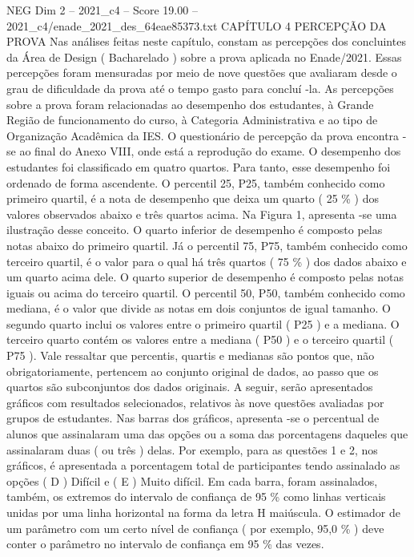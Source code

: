 \begin{textsample}{NEG Dim 2 – 2021\_c4 – Score 19.00 – 2021\_c4/enade\_2021\_des\_64eae85373.txt}  \label{ex:f2_neg_404}
CAPÍTULO 4 PERCEPÇÃO DA PROVA Nas análises feitas neste capítulo, constam as percepções dos concluintes da Área de Design ( Bacharelado ) sobre a prova aplicada no Enade/2021.
Essas percepções foram mensuradas por meio de nove questões que avaliaram desde o grau de dificuldade da prova até o tempo gasto para concluí -la.
As percepções sobre a prova foram relacionadas ao desempenho dos estudantes, à Grande Região de funcionamento do curso, à Categoria Administrativa e ao tipo de Organização Acadêmica da IES.
O questionário de percepção da prova encontra -se ao final do Anexo VIII, onde está a reprodução do exame.
O desempenho dos estudantes foi classificado em quatro quartos.
Para tanto, esse desempenho foi ordenado de forma ascendente.
O percentil 25, P25, também conhecido como primeiro quartil, é a nota de desempenho que deixa um quarto ( 25 \% ) dos valores observados abaixo e três quartos acima.
Na Figura 1, apresenta -se uma ilustração desse conceito.
O quarto inferior de desempenho é composto pelas notas abaixo do primeiro quartil.
Já o percentil 75, P75, também conhecido como terceiro quartil, é o valor para o qual há três quartos ( 75 \% ) dos dados abaixo e um quarto acima dele.
O quarto superior de desempenho é composto pelas notas iguais ou acima do terceiro quartil.
O percentil 50, P50, também conhecido como mediana, é o valor que divide as notas em dois conjuntos de igual tamanho.
O segundo quarto inclui os valores entre o primeiro quartil ( P25 ) e a mediana.
O terceiro quarto contém os valores entre a mediana ( P50 ) e o terceiro quartil ( P75 ).
Vale ressaltar que percentis, quartis e medianas são pontos que, não obrigatoriamente, pertencem ao conjunto original de dados, ao passo que os quartos são subconjuntos dos dados originais.
A seguir, serão apresentados gráficos com resultados selecionados, relativos às nove questões avaliadas por grupos de estudantes.
Nas barras dos gráficos, apresenta -se o percentual de alunos que assinalaram uma das opções ou a soma das porcentagens daqueles que assinalaram duas ( ou três ) delas.
Por exemplo, para as questões 1 e 2, nos gráficos, é apresentada a porcentagem total de participantes tendo assinalado as opções ( D ) Difícil e ( E ) Muito difícil.
Em cada barra, foram assinalados, também, os extremos do intervalo de confiança de 95 \% como linhas verticais unidas por uma linha horizontal na forma da letra H maiúscula.
O estimador de um parâmetro com um certo nível de confiança ( por exemplo, 95,0 \% ) deve conter o parâmetro no intervalo de confiança em 95 \% das vezes.

\end{textsample}
